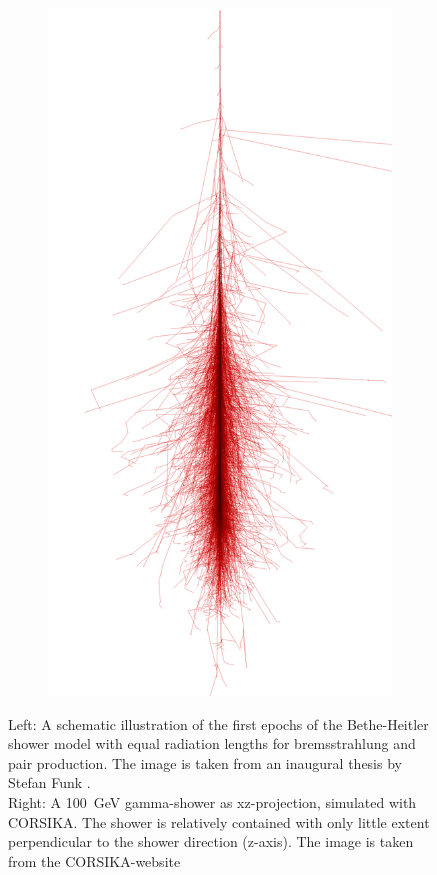 \begin{figure}
\begin{subfigure}{.2\textwidth}
		\includegraphics[width=\linewidth]{images/corsika_100gev_photon.png}
	\end{subfigure}
	\caption{
		Left: A schematic illustration of the first epochs of the 
		Bethe-Heitler shower model with equal radiation lengths for
		bremsstrahlung and pair production.
		The image is taken from an inaugural thesis 
		by Stefan Funk \cite{funk_doctor}. \\
		Right: A \SI{100}{\giga\electronvolt} gamma-shower as xz-projection, simulated with CORSIKA.
		The shower is relatively contained with only little extent perpendicular 
		to the shower direction (z-axis). The image is taken from 
		the CORSIKA-website \cite{corsika_showers}}
	\label{fig:gamma_shower}
\end{figure}

